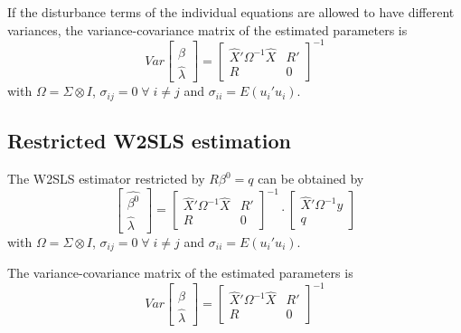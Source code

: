 If the disturbance terms of the individual equations 
are allowed to have different variances, 
the variance-covariance matrix of the estimated parameters is
\begin{equation}
   Var 
   \left[ \begin{array}{c}
      \widehat{\beta} \\ \widehat{\lambda}
   \end{array} \right] 
   = 
   \left[ \begin{array}{cc}
      \widehat{X}' \Omega^{-1} \widehat{X} & R' \\ 
      R & 0
   \end{array} \right]^{-1}
\end{equation}
with $\Omega = \Sigma \otimes I$, 
$\sigma_{ij} = 0 \; \forall \; i \neq j$ and
$\sigma_{ii} = E \left( u_i' u_i \right)$.


\subsection{Restricted W2SLS estimation}

The W2SLS estimator restricted by $R \beta^0 = q$ can be obtained by
\begin{equation}
   \left[ \begin{array}{c}
      \widehat{\beta^0} \\ \widehat{\lambda}
   \end{array} \right]
   =
   \left[ \begin{array}{cc}
      \widehat{X}' \Omega^{-1} \widehat{X} & R' \\ 
      R & 0
   \end{array} \right]^{-1}
   \cdot
   \left[ \begin{array}{c}
      \widehat{X}' \Omega^{-1} y \\ q 
   \end{array} \right]
\end{equation}
with $\Omega = \Sigma \otimes I$, 
$\sigma_{ij} = 0 \; \forall \; i \neq j$ and
$\sigma_{ii} = E \left( u_i' u_i \right)$.

The variance-covariance matrix of the estimated parameters is
\begin{equation}
   Var 
   \left[ \begin{array}{c}
      \widehat{\beta} \\ \widehat{\lambda}
   \end{array} \right] 
   = 
   \left[ \begin{array}{cc}
      \widehat{X}' \Omega^{-1} \widehat{X} & R' \\ 
      R & 0
   \end{array} \right]^{-1}
\end{equation}


